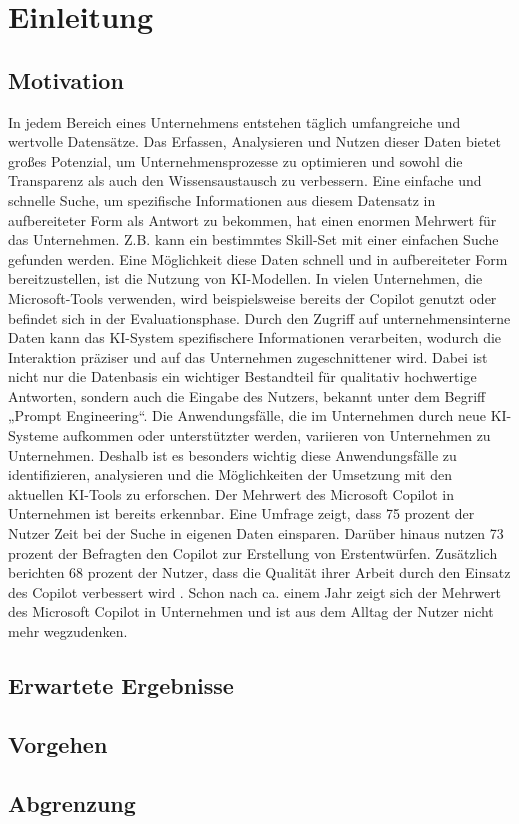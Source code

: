 \chapter{Einleitung}

\section{Motivation}
In jedem Bereich eines Unternehmens entstehen täglich umfangreiche und
wertvolle Datensätze. Das Erfassen, Analysieren und Nutzen dieser Daten bietet
 großes Potenzial, um Unternehmensprozesse zu optimieren und sowohl
die Transparenz als auch den Wissensaustausch zu verbessern. Eine einfache und
schnelle Suche, um spezifische Informationen aus diesem Datensatz in
aufbereiteter Form als Antwort zu bekommen, hat einen enormen Mehrwert für das
Unternehmen. Z.B. kann ein bestimmtes Skill-Set mit einer einfachen Suche
 gefunden werden. Eine Möglichkeit diese Daten schnell und in
aufbereiteter Form bereitzustellen, ist die Nutzung von KI-Modellen. In vielen
Unternehmen, die Microsoft-Tools verwenden, wird beispielsweise bereits der
Copilot genutzt oder befindet sich in der Evaluationsphase. Durch den Zugriff
auf unternehmensinterne Daten kann das KI-System spezifischere Informationen
verarbeiten, wodurch die Interaktion präziser und auf das Unternehmen
zugeschnittener wird. Dabei ist nicht nur die Datenbasis ein wichtiger
Bestandteil für qualitativ hochwertige Antworten, sondern auch die Eingabe des
Nutzers, bekannt unter dem Begriff „Prompt Engineering“. Die Anwendungsfälle,
die im Unternehmen durch neue KI-Systeme aufkommen oder unterstützter werden,
variieren von Unternehmen zu Unternehmen. Deshalb ist es besonders wichtig
diese Anwendungsfälle zu identifizieren, analysieren und die Möglichkeiten der
Umsetzung mit den aktuellen KI-Tools zu erforschen. Der Mehrwert des Microsoft
Copilot in Unternehmen ist bereits erkennbar. Eine Umfrage zeigt, dass 75
\cite{kalliamvakouResearchQuantifyingGitHub2022} prozent der Nutzer Zeit bei
der Suche in eigenen Daten einsparen. Darüber hinaus nutzen 73 prozent der
Befragten den Copilot zur Erstellung von Erstentwürfen. Zusätzlich berichten 68
prozent der Nutzer, dass die Qualität ihrer Arbeit durch den Einsatz des
Copilot verbessert wird . Schon nach ca. einem Jahr zeigt sich der Mehrwert des
Microsoft Copilot in Unternehmen und ist aus dem Alltag der Nutzer nicht mehr
wegzudenken.

\section{Erwartete Ergebnisse}

\section{Vorgehen}

\section{Abgrenzung}